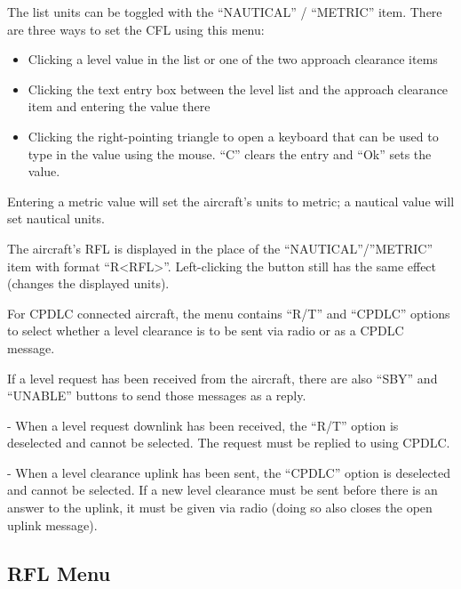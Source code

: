 \documentclass[a4paper,oneside,11pt]{memoir}
\begin{document}
\bigskip

The list units can be toggled with the “NAUTICAL” / “METRIC” item. There are three ways to set the CFL using this menu:

\bigskip

\begin{itemize}
        \item Clicking a level value in the list or one of the two approach clearance items
        \item Clicking the text entry box between the level list and the approach clearance item and entering the value there
        \item Clicking the right-pointing triangle to open a keyboard that can be used to type in the value using the mouse. “C” clears the entry and “Ok” sets the value.
\end{itemize}

\bigskip

Entering a metric value will set the aircraft’s units to metric; a nautical value will set nautical units.

\bigskip

The aircraft’s RFL is displayed in the place of the “NAUTICAL”/”METRIC” item with format “R<RFL>”. Left-clicking the button still has the same effect (changes the displayed units).


For CPDLC connected aircraft, the menu contains “R/T” and “CPDLC” options to select whether a level clearance is to be sent via radio or as a CPDLC message.

\bigskip

If a level request has been received from the aircraft, there are also “SBY” and “UNABLE” buttons to send those messages as a reply.

\bigskip

- When a level request downlink has been received, the “R/T” option is deselected and cannot be selected. The request must be replied to using CPDLC.

\bigskip

- When a level clearance uplink has been sent, the “CPDLC” option is deselected and cannot be selected. If a new level clearance must be sent before there is an answer to the uplink, it must be given via radio (doing so also closes the open uplink message).

\subsection{RFL Menu}
\label{menu:rfl}
\end{document}
